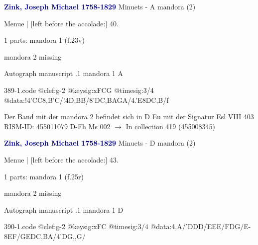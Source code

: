 \documentclass[twocolumn]{book}
\begin{document}
\newline \par \vspace{7pt} \textcolor{darkblue}{\textbf{Zink, Joseph Michael  1758-1829}}
\newline Minuets - A
\newline mandora (2)
\newline \begin{itshape}[f.23v, at left:] Menue | [left before the accolade:] 40.\end{itshape} 
\newline \textcolor{darkblue}{}  1 parts: mandora 1  (f.23v)
\newline \begin{small} mandora 2 missing\end{small} 
\newline Autograph manuscript
.1  mandora 1  A  
\begin{filecontents*}{389-1.code}
@clef:g-2
@keysig:xFCG
@timesig:3/4
@data:!4'CC{8,B'C}/!4D,BB/{8'DC},BA{GA}/4.'E{8DC,B}/f
\end{filecontents*}
\newline
%

\newline Der Band mit der mandora 2 befindet sich in D Eu mit der Signatur Esl VIII 403
\newline RISM-ID: 455011079
\newline D-Fh  Ms 002
\newline $\rightarrow$ In collection 419 (455008345)
      
\newline \par \vspace{7pt} \textcolor{darkblue}{\textbf{Zink, Joseph Michael  1758-1829}}
\newline Minuets - D
\newline mandora (2)
\newline \begin{itshape}[f.25r, at left:] Menue | [left before the accolade:] 43.\end{itshape} 
\newline \textcolor{darkblue}{}  1 parts: mandora 1  (f.25r)
\newline \begin{small} mandora 2 missing\end{small} 
\newline Autograph manuscript
.1  mandora 1  D  
\begin{filecontents*}{390-1.code}
@clef:g-2
@keysig:xFC
@timesig:3/4
@data:4,A/'DDD/EEE/FDG/E-{8EF}/{GE}{DC}{,BA}/4'DG,,G/
\end{filecontents*}
\newline
%
\end{document}
